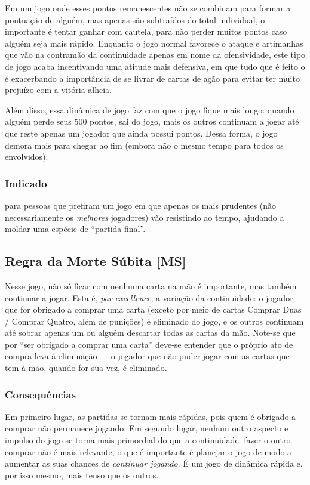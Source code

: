 Em um jogo onde esses pontos remanescentes não se combinam para formar a pontuação de alguém, mas apenas são subtraídos do total individual, o importante é tentar ganhar com cautela, para não perder muitos pontos caso alguém seja mais rápido. Enquanto o jogo normal favorece o ataque e artimanhas que vão na contramão da continuidade apenas em nome da ofensividade, este tipo de jogo acaba incentivando uma atitude mais defensiva, em que tudo que é feito o é exacerbando a importância de se livrar de cartas de ação para evitar ter muito prejuízo com a vitória alheia.

Além disso, essa dinâmica de jogo faz com que o jogo fique mais longo: quando alguém perde seus 500 pontos, sai do jogo, mais os outros continuam a jogar até que reste apenas um jogador que ainda possui pontos. Dessa forma, o jogo demora mais para chegar ao fim (embora não o mesmo tempo para todos os envolvidos).

\subsubsection{Indicado}

para pessoas que prefiram um jogo em que apenas os mais prudentes (não necessariamente os \emph{melhores} jogadores) vão resistindo ao tempo, ajudando a moldar uma espécie de ``partida final''.

\subsection{Regra da Morte Súbita [MS]}

Nesse jogo, não só ficar com nenhuma carta na mão é importante, mas também continuar a jogar. Esta é, \emph{par excellence}, a variação da continuidade: o jogador que for obrigado a comprar uma carta (exceto por meio de cartas Comprar Duas / Comprar Quatro, além de punições) é eliminado do jogo, e os outros continuam até sobrar apenas um ou alguém descartar todas as cartas da mão. Note-se que por ``ser obrigado a comprar uma carta'' deve-se entender que o próprio ato de compra leva à eliminação --- o jogador que não puder jogar com as cartas que tem à mão, quando for sua vez, é eliminado.

\subsubsection{Consequências}

Em primeiro lugar, as partidas se tornam mais rápidas, pois quem é obrigado a comprar não permanece jogando. Em segundo lugar, nenhum outro aspecto e impulso do jogo se torna mais primordial do que a continuidade: fazer o outro comprar não é mais relevante, o que é importante é planejar o jogo de modo a aumentar as suas chances de \emph{continuar jogando}. É um jogo de dinâmica rápida e, por isso mesmo, mais tenso que os outros.

